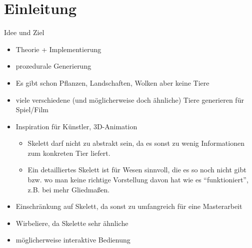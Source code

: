 \chapter{Einleitung}

Idee und Ziel

\begin{itemize}
 \item Theorie + Implementierung
 \item prozedurale Generierung
 \item Es gibt schon Pflanzen, Landschaften, Wolken \etc aber keine Tiere
 \item viele verschiedene (und möglicherweise doch ähnliche) Tiere generieren für Spiel/Film
 \item Inspiration für Künstler, 3D-Animation
    \begin{itemize}
     \item Skelett darf nicht zu abstrakt sein, da es sonst zu wenig Informationen zum konkreten Tier liefert.
     \item Ein detailliertes Skelett ist für Wesen sinnvoll, die es so noch nicht gibt bzw. wo man keine richtige Vorstellung davon hat wie es "`funktioniert"', z.B. bei mehr Gliedmaßen.
    \end{itemize}
 \item Einschränkung auf Skelett, da sonst zu umfangreich für eine Masterarbeit
 \item Wirbeliere, da Skelette sehr ähnliche
 \item möglicherweise interaktive Bedienung
\end{itemize}


